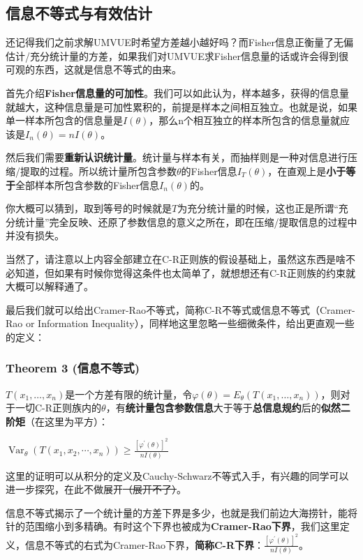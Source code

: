 \documentclass[10pt, a4paper]{article}
\begin{document}
\subsection{信息不等式与有效估计}
还记得我们之前求解UMVUE时希望方差越小越好吗？而Fisher信息正衡量了无偏估计/充分统计量的方差，如果我们对UMVUE求Fisher信息量的话或许会得到很可观的东西，这就是信息不等式的由来。\\\par
首先介绍\textbf{Fisher信息量的可加性}。我们可以如此认为，样本越多，获得的信息量就越大，这种信息量是可加性累积的，前提是样本之间相互独立。也就是说，如果单一样本所包含的信息量是$I(\theta)$，那么n个相互独立的样本所包含的信息量就应该是$I_n(\theta)=nI(\theta)$。\par
然后我们需要\textbf{重新认识统计量}。统计量与样本有关，而抽样则是一种对信息进行压缩/提取的过程。所以统计量所包含参数$\theta$的Fisher信息$I_T(\theta)$，在直观上是\textbf{小于等于}全部样本所包含参数的Fisher信息$I_n(\theta)$的。\par
你大概可以猜到，取到等号的时候就是$T$为充分统计量的时候，这也正是所谓“充分统计量”完全反映、还原了参数信息的意义之所在，即在压缩/提取信息的过程中并没有损失。\par
当然了，请注意以上内容全部建立在C-R正则族的假设基础上，虽然这东西是啥不必知道，但如果有时候你觉得这条件也太简单了，就想想还有C-R正则族的约束就大概可以解释通了。\par
最后我们就可以给出Cramer-Rao不等式，简称C-R不等式或信息不等式（Cramer-Rao or Information Inequality），同样地这里忽略一些细微条件，给出更直观一些的定义：


\subsubsection*{Theorem 3 (信息不等式)}

$T(x_1,\dots,x_n)$是一个方差有限的统计量，令$\varphi(\theta) = E_\theta (T(x_1,\dots,x_n))$，则对于一切C-R正则族内的$\theta$，有\textbf{统计量包含参数信息}大于等于\textbf{总信息规约}后的\textbf{似然二阶矩}（在这里为平方）：

\begin{center}
    $\operatorname{Var}_{\theta}\left(T\left(x_{1}, x_{2}, \cdots, x_{n}\right)\right) \geqslant \frac{\left[\varphi^{\prime}(\theta)\right]^{2}}{n I(\theta)}$
\end{center} \par
这里的证明可以从积分的定义及Cauchy-Schwarz不等式入手，有兴趣的同学可以进一步探究，在此不做展开\sout{（展开不了）}。\\\par
信息不等式揭示了一个统计量的方差下界是多少，也就是我们前边大海捞针，能将针的范围缩小到多精确。有时这个下界也被成为\textbf{Cramer-Rao下界}，我们这里定义，信息不等式的右式为Cramer-Rao下界，\textbf{简称C-R下界}：$ \frac{\left[\varphi^{\prime}(\theta)\right]^{2}}{n I(\theta)}$。\par
\end{document}
